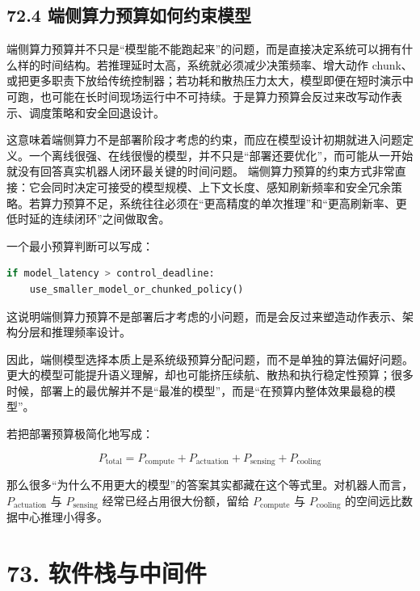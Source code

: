 \subsection*{72.4 端侧算力预算如何约束模型}


端侧算力预算并不只是“模型能不能跑起来”的问题，而是直接决定系统可以拥有什么样的时间结构。若推理延时太高，系统就必须减少决策频率、增大动作 chunk、或把更多职责下放给传统控制器；若功耗和散热压力太大，模型即便在短时演示中可跑，也可能在长时间现场运行中不可持续。于是算力预算会反过来改写动作表示、调度策略和安全回退设计。

这意味着端侧算力不是部署阶段才考虑的约束，而应在模型设计初期就进入问题定义。一个离线很强、在线很慢的模型，并不只是“部署还要优化”，而可能从一开始就没有回答真实机器人闭环最关键的时间问题。 端侧算力预算的约束方式非常直接：它会同时决定可接受的模型规模、上下文长度、感知刷新频率和安全冗余策略。若算力预算不足，系统往往必须在“更高精度的单次推理”和“更高刷新率、更低时延的连续闭环”之间做取舍。

一个最小预算判断可以写成：

\begin{lstlisting}[language=python]
if model_latency > control_deadline:
    use_smaller_model_or_chunked_policy()
\end{lstlisting}

这说明端侧算力预算不是部署后才考虑的小问题，而是会反过来塑造动作表示、架构分层和推理频率设计。

因此，端侧模型选择本质上是系统级预算分配问题，而不是单独的算法偏好问题。更大的模型可能提升语义理解，却也可能挤压续航、散热和执行稳定性预算；很多时候，部署上的最优解并不是“最准的模型”，而是“在预算内整体效果最稳的模型”。

若把部署预算极简化地写成：

\begingroup
\scriptsize
\begin{equation*}
P_{\text{total}} = P_{\text{compute}} + P_{\text{actuation}} + P_{\text{sensing}} + P_{\text{cooling}}
\end{equation*}
\endgroup

那么很多“为什么不用更大的模型”的答案其实都藏在这个等式里。对机器人而言，\(P_{\text{actuation}}\) 与 \(P_{\text{sensing}}\) 经常已经占用很大份额，留给 \(P_{\text{compute}}\) 与 \(P_{\text{cooling}}\) 的空间远比数据中心推理小得多。

\section*{73. 软件栈与中间件}

